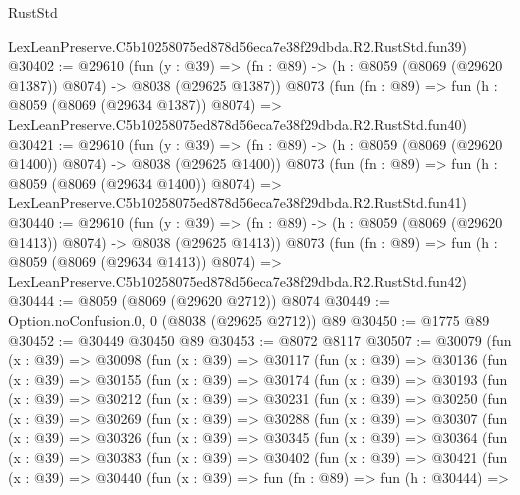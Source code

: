 \begin{lexlean}{RustStd}
\begin{coremodule}
    LexLeanPreserve.C5b10258075ed878d56eca7e38f29dbda.R2.RustStd.fun39)
@30402 := @29610
    (fun (y : @39) =>
    (fn : @89) -> (h : @8059 (@8069 (@29620 @1387)) @8074) -> @8038 (@29625 @1387))
    @8073
    (fun (fn : @89) =>
    fun (h : @8059 (@8069 (@29634 @1387)) @8074) =>
    LexLeanPreserve.C5b10258075ed878d56eca7e38f29dbda.R2.RustStd.fun40)
@30421 := @29610
    (fun (y : @39) =>
    (fn : @89) -> (h : @8059 (@8069 (@29620 @1400)) @8074) -> @8038 (@29625 @1400))
    @8073
    (fun (fn : @89) =>
    fun (h : @8059 (@8069 (@29634 @1400)) @8074) =>
    LexLeanPreserve.C5b10258075ed878d56eca7e38f29dbda.R2.RustStd.fun41)
@30440 := @29610
    (fun (y : @39) =>
    (fn : @89) -> (h : @8059 (@8069 (@29620 @1413)) @8074) -> @8038 (@29625 @1413))
    @8073
    (fun (fn : @89) =>
    fun (h : @8059 (@8069 (@29634 @1413)) @8074) =>
    LexLeanPreserve.C5b10258075ed878d56eca7e38f29dbda.R2.RustStd.fun42)
@30444 := @8059 (@8069 (@29620 @2712)) @8074
@30449 := Option.noConfusion.{0, 0} (@8038 (@29625 @2712)) @89
@30450 := @1775 @89
@30452 := @30449 @30450 @89
@30453 := @8072 @8117
@30507 := @30079
    (fun (x : @39) =>
    @30098
      (fun (x : @39) =>
      @30117
        (fun (x : @39) =>
        @30136
          (fun (x : @39) =>
          @30155
            (fun (x : @39) =>
            @30174
              (fun (x : @39) =>
              @30193
                (fun (x : @39) =>
                @30212
                  (fun (x : @39) =>
                  @30231
                    (fun (x : @39) =>
                    @30250
                      (fun (x : @39) =>
                      @30269
                        (fun (x : @39) =>
                        @30288
                          (fun (x : @39) =>
                          @30307
                            (fun (x : @39) =>
                            @30326
                              (fun (x : @39) =>
                              @30345
                                (fun (x : @39) =>
                                @30364
                                  (fun (x : @39) =>
                                  @30383
                                    (fun (x : @39) =>
                                    @30402
                                      (fun (x : @39) =>
                                      @30421
                                        (fun (x : @39) =>
                                        @30440
                                          (fun (x : @39) =>
                                          fun (fn : @89) =>
                                          fun (h : @30444) =>

\end{coremodule}
\end{lexlean}
